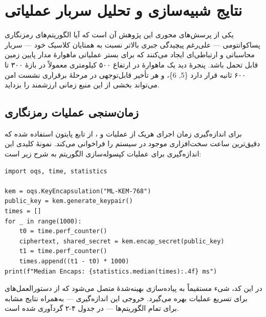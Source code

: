 \documentclass[a4paper,14pt]{extreport}
\begin{document}
\section{نتایج شبیه‌سازی  و تحلیل سربار عملیاتی}

یکی از پرسش‌های محوری این پژوهش آن است که آیا الگوریتم‌های رمزنگاری پساکوانتومی --- علی‌رغم پیچیدگی جبری بالاتر نسبت به همتایان کلاسیک خود --- سربار محاسباتی و ارتباطی‌ای ایجاد می‌کنند که برای بستر عملیاتی ماهوارهٔ مدار پایین زمین قابل تحمل باشد. پنجرهٔ دید یک ماهوارهٔ  در ارتفاع ۵۰۰ کیلومتری معمولاً در بازهٔ ۳۰۰ تا ۶۰۰ ثانیه قرار دارد \{5, 6\}، و هر تأخیر قابل‌توجهی در مرحلهٔ برقراری نشست امن می‌تواند بخشی از این منبع زمانی ارزشمند را بزداید.

\subsection{زمان‌سنجی عملیات رمزنگاری}

برای اندازه‌گیری زمان اجرای هریک از عملیات  و ، از تابع  پایتون استفاده شده که دقیق‌ترین ساعت سخت‌افزاری موجود در سیستم را فراخوانی می‌کند. نمونهٔ کلیدی این اندازه‌گیری برای عملیات کپسوله‌سازی  الگوریتم  به شرح زیر است:

\begin{small}
\begin{latin}
\begin{verbatim}
import oqs, time, statistics

kem = oqs.KeyEncapsulation("ML-KEM-768")
public_key = kem.generate_keypair()
times = []
for _ in range(1000):
    t0 = time.perf_counter()
    ciphertext, shared_secret = kem.encap_secret(public_key)
    t1 = time.perf_counter()
    times.append((t1 - t0) * 1000)
print(f"Median Encaps: {statistics.median(times):.4f} ms")
\end{verbatim}
\end{latin}
\end{small}

در این کد، شیء  مستقیماً به پیاده‌سازی  بهینه‌شدهٔ  متصل می‌شود که از دستورالعمل‌های  برای تسریع عملیات  بهره می‌گیرد. خروجی این اندازه‌گیری --- به‌همراه نتایج مشابه برای تمام الگوریتم‌ها --- در جدول ۴-۲ گردآوری شده است.
\end{document}
